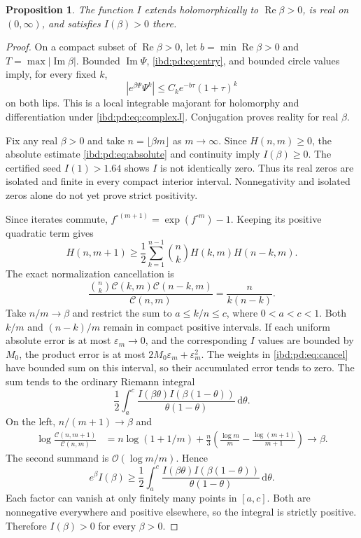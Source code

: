 \documentclass[11pt,letterpaper]{article}
\newtheorem{proposition}[theorem]{Proposition}
\theoremstyle{remark}\newtheorem{remark}[theorem]{Remark}
\newcommand{\dd}{\,\mathrm d}
\newcommand{\Oh}{\mathcal O}
\DeclareMathOperator{\Rea}{Re}
\DeclareMathOperator{\Ima}{Im}
\begin{document}
\begin{proposition}\label{ibd:pd:prop:positive}
The function $I$ extends holomorphically to $\Rea\beta>0$, is real on $(0,\infty)$, and satisfies $I(\beta)>0$ there.
\end{proposition}
\begin{proof}
On a compact subset of $\Rea\beta>0$, let $b=\min\Rea\beta>0$ and $T=\max|\Ima\beta|$. Bounded $\Ima\Psi$, \eqref{ibd:pd:eq:entry}, and bounded circle values imply, for every fixed $k$,
\[
 |e^{\beta\Psi}\Psi^k|\leq C_k e^{-b\tau}(1+\tau)^k
\]
on both lips. This is a local integrable majorant for holomorphy and differentiation under \eqref{ibd:pd:eq:complexJ}. Conjugation proves reality for real $\beta$.

Fix any real $\beta>0$ and take $n=\lfloor\beta m\rfloor$ as $m\to\infty$. Since $H(n,m)\geq0$, the absolute estimate \eqref{ibd:pd:eq:absolute} and continuity imply $I(\beta)\geq0$. The certified seed $I(1)>1.64$ shows $I$ is not identically zero. Thus its real zeros are isolated and finite in every compact interior interval. Nonnegativity and isolated zeros alone do not yet prove strict positivity.

Since iterates commute,
$f^{\circ(m+1)}=\exp(f^{\circ m})-1$. Keeping its positive quadratic term gives
\begin{equation}\label{ibd:pd:eq:quadratic}
 H(n,m+1)\geq\frac12\sum_{k=1}^{n-1}\binom nk H(k,m)H(n-k,m).
\end{equation}
The exact normalization cancellation is
\begin{equation}\label{ibd:pd:eq:cancel}
 \frac{\binom nk\mathcal C(k,m)\mathcal C(n-k,m)}{\mathcal C(n,m)}
 =\frac n{k(n-k)}.
\end{equation}
Take $n/m\to\beta$ and restrict the sum to $a\leq k/n\leq c$, where $0<a<c<1$. Both $k/m$ and $(n-k)/m$ remain in compact positive intervals. If each uniform absolute error is at most $\varepsilon_m\to0$, and the corresponding $I$ values are bounded by $M_0$, the product error is at most $2M_0\varepsilon_m+\varepsilon_m^2$. The weights in \eqref{ibd:pd:eq:cancel} have bounded sum on this interval, so their accumulated error tends to zero. The sum tends to the ordinary Riemann integral
\[
 \frac12\int_a^c\frac{I(\beta\theta)I(\beta(1-\theta))}
 {\theta(1-\theta)}\dd\theta.
\]
On the left, $n/(m+1)\to\beta$ and
\begin{align*}
 \log\frac{\mathcal C(n,m+1)}{\mathcal C(n,m)}
 &=n\log(1+1/m)+\frac n3\left(\frac{\log m}{m}
 -\frac{\log(m+1)}{m+1}\right)\longrightarrow\beta.
\end{align*}
The second summand is $\Oh(\log m/m)$. Hence
\begin{equation}\label{ibd:pd:eq:positiveintegral}
 e^\beta I(\beta)\geq\frac12\int_a^c
 \frac{I(\beta\theta)I(\beta(1-\theta))}{\theta(1-\theta)}\dd\theta.
\end{equation}
Each factor can vanish at only finitely many points in $[a,c]$. Both are nonnegative everywhere and positive elsewhere, so the integral is strictly positive. Therefore $I(\beta)>0$ for every $\beta>0$.
\end{proof}
\end{document}
